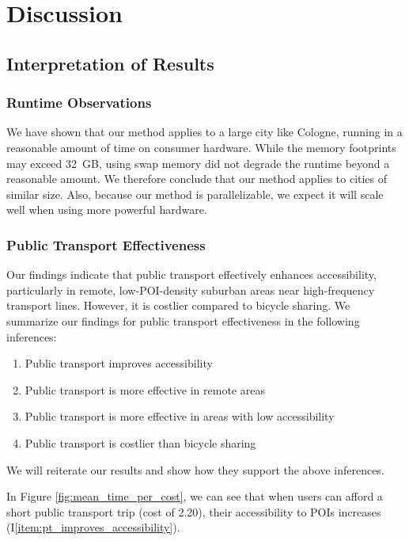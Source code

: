 \clearpage
\section{Discussion}
\label{sec:discussion}

\subsection{Interpretation of Results}

\subsubsection{Runtime Observations}
We have shown that our method applies to a large city like Cologne, running in a reasonable amount of time on consumer hardware.
While the memory footprints may exceed 32 GB, using swap memory did not degrade the runtime beyond a reasonable amount.
We therefore conclude that our method applies to cities of similar size.
Also, because our method is parallelizable, we expect it will scale well when using more powerful hardware.

\subsubsection{Public Transport Effectiveness}
Our findings indicate that public transport effectively enhances accessibility, particularly in remote, low-POI-density suburban areas near high-frequency transport lines. 
However, it is costlier compared to bicycle sharing.
We summarize our findings for public transport effectiveness in the following inferences:
\begin{enumerate}
  \renewcommand{\labelenumi}{I\theenumi.}
  \item Public transport improves accessibility \label{item:pt_improves_accessibility}
  \item Public transport is more effective in remote areas \label{item:pt_effective_in_remote_areas}
  \item Public transport is more effective in areas with low accessibility \label{item:pt_effective_in_areas_with_low_accessibility}
  \item Public transport is costlier than bicycle sharing \label{item:pt_costlier_than_bicycle_sharing}
\end{enumerate}
We will reiterate our results and show how they support the above inferences.

In Figure \ref{fig:mean_time_per_cost}, we can see that when users can afford a short public transport trip (cost of 2.20), their accessibility to POIs increases (I\ref{item:pt_improves_accessibility}).


